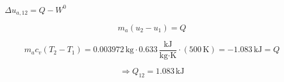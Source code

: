 

\item[c)] $\Delta u_{a,12} = Q - W^0$
    
    \[
    m_a (u_2 - u_1) = Q
    \]
    
    \[
    m_a c_v (T_2 - T_1) = 0.003972 \, \text{kg} \cdot 0.633 \, \frac{\text{kJ}}{\text{kg} \cdot \text{K}} \cdot (500 \, \text{K}) = -1.083 \, \text{kJ} = Q
    \]
    
    \[
    \Rightarrow Q_{12} = 1.083 \, \text{kJ}
    \]